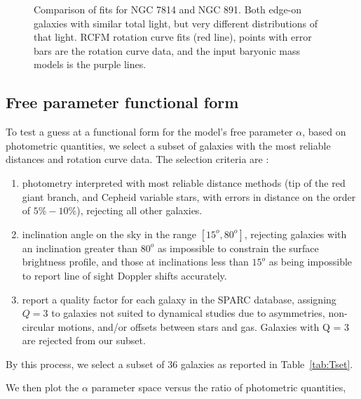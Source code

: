 \documentclass[reprint,%
 amsmath,amssymb,
 aps,
]{revtex4-1}
\begin{document}
\begin{figure}
\begin{minipage}{.5\textwidth}
  \label{fig:test1}
\end{minipage}
 \caption{Comparison of fits for NGC 7814 and NGC 891. Both edge-on galaxies with similar total light, but very different distributions of that light.     RCFM rotation curve fits (red line), points with error bars are the rotation curve data, and the input baryonic mass models is  the purple lines.  }
 \label{fitCompare7814_891}
\end{figure}
 
 
 
 
  

\subsection{Free parameter functional form }\label{FreeCorrel}

  To test a guess at a functional form  for the  model's free parameter $\alpha$,  based on photometric quantities, we   select a subset of galaxies with the most reliable distances and rotation curve data. 
  The selection  criteria are \cite{2016Lelli}:  
  \begin{enumerate}
      \item photometry interpreted with most reliable  distance methods    (tip of the red giant branch, and Cepheid variable stars,  with errors in distance on the order of $5\% - 10\%$), rejecting all other galaxies. \\
      \item  inclination angle on the sky  in the range  $[15^o, 80^o]$, rejecting galaxies with an inclination  greater than $80^o$ as impossible to constrain the surface brightness profile, and those at inclinations less than $15^o$ as being impossible to  report line of sight Doppler shifts accurately.\\
      \item  \citet{2016Lelli}   report a quality factor for each galaxy in the SPARC database, assigning  $Q=3$ to galaxies not suited to dynamical studies due to     asymmetries,  non-circular motions, and/or offsets between stars and gas. Galaxies with Q = 3 are rejected from our subset.
  \end{enumerate}
    By this process, we select a subset of 36 galaxies as reported in Table~\ref{tab:Tset}. 


 We then plot the  $\alpha$   parameter  space versus the ratio of  photometric quantities,  
  
\end{document}
